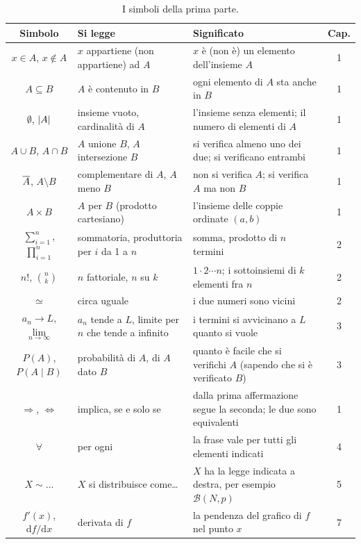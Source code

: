 \begin{table}[H]
\centering
\renewcommand{\arraystretch}{1.22}
\begin{tabular}{@{}clP{7.2cm}c@{}}
  \toprule
  \textbf{Simbolo} & \textbf{Si legge} & \textbf{Significato} & \textbf{Cap.} \\
  \midrule
  $x \in A$, $x \notin A$ & $x$ appartiene (non appartiene) ad $A$ & $x$ è (non è) un elemento dell'insieme $A$ & 1 \\
  $A \subseteq B$ & $A$ è contenuto in $B$ & ogni elemento di $A$ sta anche in $B$ & 1 \\
  $\emptyset$, $\left\lvert A \right\rvert$ & insieme vuoto, cardinalità di $A$ & l'insieme senza elementi; il numero di elementi di $A$
    & 1 \\
  $A \cup B$, $A \cap B$ & $A$ unione $B$, $A$ intersezione $B$ & si verifica almeno uno dei due; si verificano
    entrambi & 1 \\
  $\overline{A}$, $A \setminus B$ & complementare di $A$, $A$ meno $B$ & non si verifica $A$; si verifica $A$ ma non $B$ & 1 \\
  $A \times B$ & $A$ per $B$ (prodotto cartesiano) & l'insieme delle coppie ordinate $(a, b)$ & 1 \\
  $\sum_{i=1}^{n}$, $\prod_{i=1}^{n}$ & sommatoria, produttoria per $i$ da 1 a $n$ & somma, prodotto di $n$ termini
    & 2 \\
  $n!$, $\binom{n}{k}$ & $n$ fattoriale, $n$ su $k$ & $1 \cdot 2 \cdots n$; i sottoinsiemi di $k$ elementi fra $n$ & 2 \\
  $\simeq$ & circa uguale & i due numeri sono vicini & 2 \\
  $a_n \to L$, $\lim\limits_{n \to \infty}$ & $a_n$ tende a $L$, limite per $n$ che tende a infinito & i termini si
    avvicinano a $L$ quanto si vuole & 3 \\
  $P(A)$, $P(A \mid B)$ & probabilità di $A$, di $A$ dato $B$ & quanto è facile che si verifichi $A$ (sapendo che si
    è verificato $B$) & 3 \\
  $\Longrightarrow$, $\iff$ & implica, se e solo se & dalla prima affermazione segue la seconda; le due sono
    equivalenti & 1 \\
  $\forall$ & per ogni & la frase vale per tutti gli elementi indicati & 4 \\
  $X \sim \ldots$ & $X$ si distribuisce come\ldots & $X$ ha la legge indicata a destra, per esempio $\mathcal{B}(N, p)$
    & 5 \\
  $f'(x)$, $\mathrm{d}f / \mathrm{d}x$ & derivata di $f$ & la pendenza del grafico di $f$ nel punto $x$ & 7 \\
  \bottomrule
\end{tabular}
\caption{I simboli della prima parte.}
\end{table}

